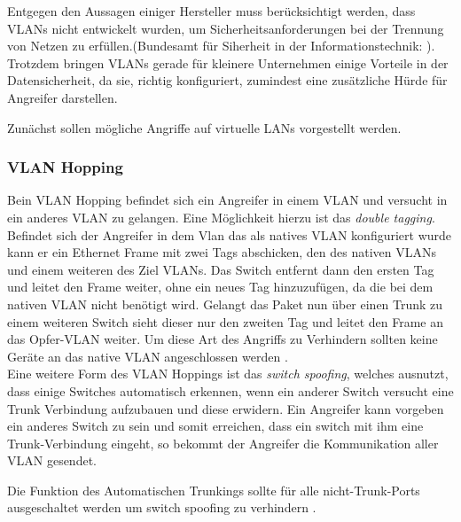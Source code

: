 \glqq Entgegen den Aussagen einiger Hersteller muss berücksichtigt werden, dass VLANs nicht entwickelt wurden, um Sicherheitsanforderungen bei der Trennung von Netzen zu erfüllen.\grqq (Bundesamt für Siherheit in der Informationstechnik: \cite{bsiswitch}).\\

Trotzdem bringen VLANs gerade für kleinere Unternehmen einige Vorteile in der Datensicherheit, da sie, richtig konfiguriert, zumindest eine zusätzliche Hürde für Angreifer darstellen.

Zunächst sollen mögliche Angriffe auf virtuelle LANs vorgestellt werden.

 \subsubsection{VLAN Hopping}
  Bein VLAN Hopping befindet sich ein Angreifer in einem VLAN und versucht in ein anderes VLAN zu gelangen\cite{alabady2008design}. 
  Eine Möglichkeit hierzu ist das \emph{double tagging}. Befindet sich der Angreifer in dem Vlan das als natives VLAN konfiguriert wurde kann er ein Ethernet Frame mit zwei Tags abschicken, den des nativen VLANs und einem weiteren des Ziel VLANs. Das Switch entfernt dann den ersten Tag und leitet den Frame weiter, ohne ein neues Tag hinzuzufügen, da die bei dem nativen VLAN nicht benötigt wird. Gelangt das Paket nun über einen Trunk zu einem weiteren Switch sieht dieser nur den zweiten Tag und leitet den Frame an das Opfer-VLAN weiter.
  Um diese Art des Angriffs zu Verhindern sollten keine Geräte an das native VLAN angeschlossen werden \cite{cisco14rout}.\\
  
  
  
 Eine weitere Form des VLAN Hoppings ist das \emph{switch spoofing}, welches ausnutzt, dass einige Switches automatisch erkennen, wenn ein anderer Switch versucht eine Trunk Verbindung aufzubauen und diese erwidern. Ein Angreifer kann vorgeben ein anderes Switch zu sein und somit erreichen, dass ein switch mit ihm eine Trunk-Verbindung eingeht, so bekommt der Angreifer die Kommunikation aller VLAN gesendet. 
 
 Die Funktion des Automatischen Trunkings sollte für alle nicht-Trunk-Ports ausgeschaltet werden um switch spoofing zu verhindern \cite{cisco14rout}. 
 
  
   
 
 


